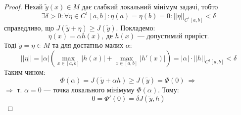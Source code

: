 \documentclass[14pt,a4paper]{scrartcl}
\theoremstyle{definition}
\theoremstyle{definition}
\theoremstyle{definition}
\begin{document}
\begin{proof}
  Нехай $\tilde{y}(x) \in M$ дає слабкий локальний мінімум задачі, тобто $$\exists \delta > 0 : \forall \eta \in C^1[a, b] : \eta(a) = \eta(b) = 0 : ||\eta||_{C^1[a,b]} < \delta$$ справедливо, що $J(\tilde{y} + \eta) \geq J(\tilde{y})$. Покладемо: $$\eta(x) = \alpha h(x), \ \text{де } h(x) \text{ --- допустимий приріст.}$$
  Тоді $\tilde{y} = \eta \in M$ та для достатньо малих $\alpha$:
  $$
  ||\eta|| = |\alpha| \left( \max\limits_{x\in [a,b]} \left| h(x) \right| + \max\limits_{x\in [a,b]} \left| h'(x) \right| \right) = |\alpha| \cdot ||h||_{C^1[a,b]} < \delta
  $$
  Таким чином:
  $$
  \Phi(\alpha) = J( \tilde{y} + \alpha h) \geq J  (\tilde{y}) = \Phi(0) \  \Longrightarrow
  $$
  $\Longrightarrow$ т. $\alpha = 0 $ --- точка локального мінімуму $\Phi (\alpha). $ Тому:
  $$
  0 = \Phi'(0) = \delta J(\tilde{y}, h)
  $$
\end{proof}


\end{document}
